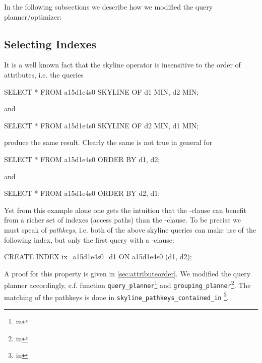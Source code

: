 In the following subsections we describe how we modified the query
planner/optimizer:


\subsection{Selecting Indexes}
It is a well known fact that the skyline operator is insensitive to the
order of attributes, i.e. the queries

\begin{interactive}
SELECT * FROM a15d1e4s0 SKYLINE OF d1 MIN, d2 MIN;
\end{interactive}

\noindent
and

\begin{interactive}
SELECT * FROM a15d1e4s0 SKYLINE OF d2 MIN, d1 MIN;
\end{interactive}

\noindent
produce the same result.  Clearly the same is not true in general for

\begin{interactive}
SELECT * FROM a15d1e4s0 ORDER BY d1, d2;
\end{interactive}

\noindent
and

\begin{interactive}
SELECT * FROM a15d1e4s0 ORDER BY d2, d1;
\end{interactive}

\noindent
Yet from this example alone one gets the intuition that the
-clause can benefit from a richer set of indexes
(access paths) than the -clause.  To be
precise we must speak of \emph{pathkeys}, i.e. both of
the above skyline queries can make use of the following index, but
only the first query with a -clause:

\begin{interactive}
CREATE INDEX ix_a15d1e4s0_d1 ON a15d1e4s0 (d1, d2);
\end{interactive}

A proof for this property is given in
\autoref{sec:attributeorder}. We modified the query planner
accordingly, c.f.  function \texttt{query\_planner}\footnote{in
} and
\texttt{grouping\_planner}\footnote{in }.
The matching of the pathkeys is done in \texttt{skyline\_pathkeys\_contained\_in}
\footnote{in }.

